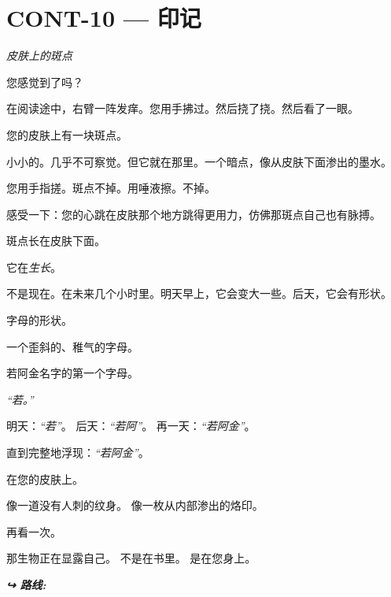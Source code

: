 \section*{\textbf{CONT-10} --- 印记}

\noindent \textit{皮肤上的斑点}

\noindent 您感觉到了吗？

\noindent 在阅读途中，右臂一阵发痒。您用手拂过。然后挠了挠。然后看了一眼。

\noindent 您的皮肤上有一块斑点。

\noindent 小小的。几乎不可察觉。但它就在那里。一个暗点，像从皮肤下面渗出的墨水。

\noindent 您用手指搓。斑点不掉。用唾液擦。不掉。

\noindent 感受一下：您的心跳在皮肤那个地方跳得更用力，仿佛那斑点自己也有脉搏。

\noindent 斑点长在皮肤下面。

\noindent 它在\textit{生长}。

\noindent 不是现在。在未来几个小时里。明天早上，它会变大一些。后天，它会有形状。

\noindent 字母的形状。

\noindent 一个歪斜的、稚气的字母。

\noindent 若阿金名字的第一个字母。

\noindent \textit{\textquotedblleft{}若。\textquotedblright{}}

\noindent 明天：\textit{\textquotedblleft{}若\textquotedblright{}}。
\noindent 后天：\textit{\textquotedblleft{}若阿\textquotedblright{}}。
\noindent 再一天：\textit{\textquotedblleft{}若阿金\textquotedblright{}}。

\noindent 直到完整地浮现：\textit{\textquotedblleft{}若阿金\textquotedblright{}}。

\noindent 在您的皮肤上。

\noindent 像一道没有人刺的纹身。
\noindent 像一枚从内部渗出的烙印。

\noindent 再看一次。

\noindent 那生物正在显露自己。
\noindent 不是在书里。
\noindent 是在您身上。

\vspace{0.5em}
\noindent\textit{\textbf{↪ 路线:}  \rotasep {}}
